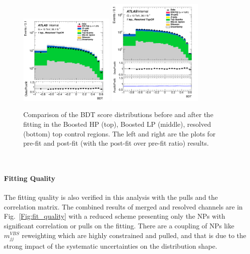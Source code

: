 \begin{figure}[!ht]
	\includegraphics[width=0.42\textwidth]{Chapter5/BDT_1lep_res_CRTop_prefit.pdf}
	\includegraphics[width=0.42\textwidth]{Chapter5/BDT_1lep_res_CRTop_postfit.pdf}	
	\caption{\label{Fig:data_mc_vbs_tcr}
             Comparison of the BDT score distributions before and after the fitting in the  
             Boosted HP (top), Boosted LP (middle), resolved (bottom) top control regions. The left and right are the plots for pre-fit and post-fit (with the post-fit over pre-fit ratio) results. 
	}
\end{figure}
\noindent
\\
\\{\bf Fitting Quality}
\\
\\The fitting quality is also verified in this analysis with the pulls and the correlation matrix. The combined results of merged and resolved channels are in Fig.~\ref{Fig:fit_quality} with a reduced scheme presenting only the NPs with significant correlation or pulls on the fitting. There are a coupling of NPs like $m^{VBS}_{jj}$ reweighting which are highly constrained and pulled, and that is due to the strong impact of the systematic uncertainties on the distribution shape. 
